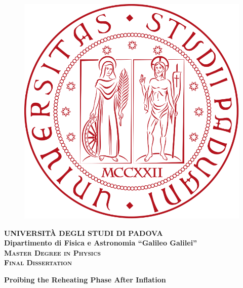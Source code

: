 \documentclass[11pt,a4paper,twoside]{book}
\begin{document}
	\frontmatter
	\begin{titlepage}
		\vspace{5mm}
		\begin{figure}[hbtp]
			\centering
			\includegraphics[scale=.16]{Logo_unipd.png}
		\end{figure}
		\vspace{5mm}
		\begin{center}
			{{\huge{\textsc{\bf UNIVERSIT\`A DEGLI STUDI DI PADOVA}}}\\}
			\vspace{5mm}
			{\Large{\bf Dipartimento di Fisica e Astronomia ``Galileo Galilei''}} \\
			\vspace{5mm}
			{\Large{\textsc{\bf Master Degree in Physics}}}\\
			\vspace{20mm}
			{\Large{\textsc{\bf Final Dissertation}}}\\
			\vspace{30mm}
			\begin{spacing}{3}
				{\LARGE \textbf{Proibing the Reheating Phase After Inflation}}\\
			\end{spacing}
			\vspace{8mm}
		\end{center}
		

\end{titlepage}
\end{document}
